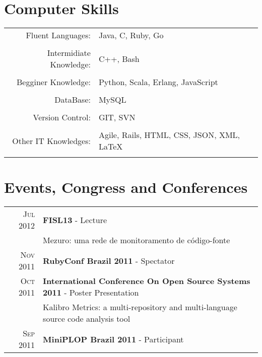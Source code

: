 \documentclass[a4paper,10pt]{article} %
\begin{document}

\section{Computer Skills}

\begin{tabular}{rp{11cm}}
Fluent Languages: & Java, C, Ruby, Go\\
    \multicolumn{2}{c}{} \\

Intermidiate Knowledge: & C++, Bash\\
    \multicolumn{2}{c}{} \\

Begginer Knowledge: & Python, Scala, Erlang, JavaScript\\
    \multicolumn{2}{c}{} \\

DataBase: & MySQL\\
    \multicolumn{2}{c}{} \\

Version Control: & GIT, SVN\\
    \multicolumn{2}{c}{} \\

Other IT Knowledges: & Agile, Rails, HTML, CSS, JSON, XML, \LaTeX\\
    \multicolumn{2}{c}{} \\

\end{tabular}

\section{Events, Congress and Conferences}

\begin{tabular}{rl}
\textsc{Jul} 2012 & \textbf{FISL13} - Lecture\\
& \footnotesize{Mezuro: uma rede de monitoramento de código-fonte}\\

\textsc{Nov} 2011 & \textbf{RubyConf Brazil 2011} - Spectator\\
\textsc{Oct} 2011 & \textbf{International Conference On Open Source Systems 2011} - Poster Presentation\\
& \footnotesize{Kalibro Metrics: a multi-repository and multi-language source code analysis tool}\\
\textsc{Sep} 2011 & \textbf{MiniPLOP Brazil 2011} - Participant


\end{tabular}
\end{document}
